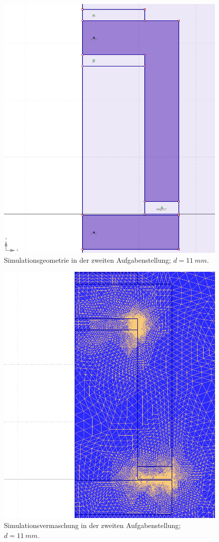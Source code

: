 \documentclass[conference,a4paper,twoside]{IEEEtran}
\begin{document}
\begin{figure}[H]
\centerline{\includegraphics[width=0.7\columnwidth]{../assets/assignment_2_geometry.png}}
\caption{Simulationsgeometrie in der zweiten Aufgabenstellung; $d = 11\ mm$.}
\label{assignment_2_geometry}
\end{figure}

\begin{figure}[H]
\centerline{\includegraphics[width=0.7\columnwidth]{../assets/assignment_2_mesh.png}}
\caption{Simulationsvermaschung in der zweiten Aufgabenstellung; $d = 11\ mm$.}
\label{assignment_2_mesh}
\end{figure}
\end{document}
